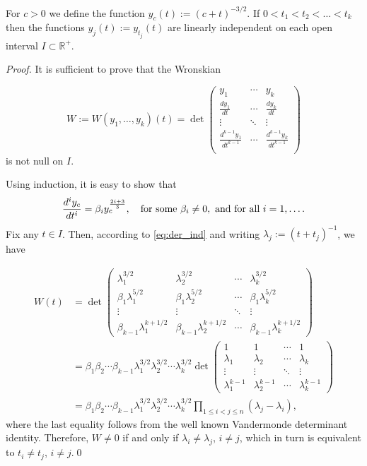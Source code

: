 \documentclass[smallcondensed]{svjour3}
\begin{document}
\begin{lemma}\label{lem:1} For $c>0$ we define the function $y_c(t):=(c+t)^{-3/2}$. If $0<t_1<t_2<\ldots<t_k$ then the functions $y_j(t):=y_{t_j}(t)$  are linearly independent on  each open interval   $I\subset \mathbb{R}^+$.
\end{lemma}
\begin{proof} It is sufficient to prove that the Wronskian

 \[W:=W(y_1,\ldots,y_k)(t)=\det\begin{pmatrix}
			      y_1 & \cdots & y_k\\
			      \frac{dy_1}{dt}&  \cdots & \frac{dy_k}{dt}\\
			      \vdots & \ddots & \vdots \\
			      \frac{d^{k-1}y_1}{dt^{k-1}}&  \cdots & \frac{d^{k-1}y_k}{dt^{k-1}}\\
                           \end{pmatrix}
\]
is not null on $I$.

Using induction, it is easy to show that
\begin{equation}\label{eq:der_ind}\frac{d^iy_c}{dt^i}=\beta_{i}y_{c}^{\frac{2i+3}{3}},\quad\hbox{for some }\beta_{i}\neq 0, \hbox{ and for all }i=1,\ldots.
\end{equation}
Fix any $t\in I$. Then, according to \eqref{eq:der_ind} and writing $\lambda_j:=(t+t_j)^{-1}$, we have

\[
\begin{split}
  W(t)&=\det
    \begin{pmatrix}
      \lambda_1^{3/2} & \lambda_2^{3/2} &\cdots & \lambda_k^{3/2} \\
      \beta_1\lambda_1^{5/2} &\beta_1 \lambda_2^{5/2} &\cdots &\beta_1 \lambda_k^{5/2}\\
      \vdots & \vdots &\ddots & \vdots\\
      \beta_{k-1}\lambda_1^{k+1/2} & \beta_{k-1}\lambda_2^{k+1/2} &\cdots & \beta_{k-1}\lambda_k^{k+1/2}
    \end{pmatrix}
  \\
  &= \beta_1\beta_2\cdots\beta_{k-1} \lambda_1^{3/2}\lambda_2^{3/2}\cdots \lambda_k^{3/2}
     \det \begin{pmatrix}
      1& 1 &\cdots & 1 \\
      \lambda_1 & \lambda_2 &\cdots & \lambda_k\\
      \vdots & \vdots &\ddots & \vdots\\
      \lambda_1^{k-1} & \lambda_2^{k-1} &\cdots & \lambda_k^{k-1}
    \end{pmatrix}
  \\
  &= \beta_1\beta_2\cdots\beta_{k-1} \lambda_1^{3/2}\lambda_2^{3/2}\cdots \lambda_k^{3/2}
  \prod_{1\leq i<j\leq n}(\lambda_j-\lambda_i)
,
\end{split}
\]
where the last equality follows from the well known Vandermonde determinant identity. Therefore, 
$W\neq 0$ if and only if $\lambda_i\neq\lambda_j$, $i\neq j$,
which in turn is equivalent to $t_i\neq t_j$, $i\neq j$.\qed
\end{proof}
\end{document}
